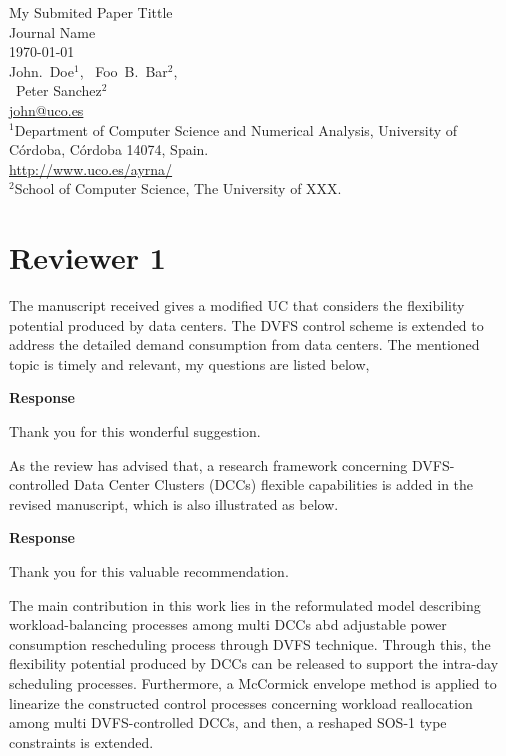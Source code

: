 \documentclass[a4paper,twoside,11pt]{reviewresponse}
\makeatletter
\newcommand{\myAuthors}{{John.~Doe$^{\displaystyle 1}$, ~Foo~B.~Bar$^{\displaystyle 2}$, } \\ {~Peter Sanchez$^{\displaystyle 2}$}}
\newcommand{\myEmail}{john@uco.es}
\newcommand{\myTitle}{My Submited Paper Tittle}
\newcommand{\myJournal}{Journal Name}
\newcommand{\myDept}{{$^{\displaystyle 1}$Department of Computer Science and Numerical Analysis, University of C\'{o}rdoba, C\'{o}rdoba 14074, Spain. \\ \url{http://www.uco.es/ayrna/}}\\
{$^{\displaystyle 2}$School of Computer Science, The University of XXX. }\\}
\makeatother
\begin{document}
\thispagestyle{plain}

\begin{center}
	{\LARGE\myTitle} \vspace{0.5cm} \\
	{\large\myJournal} \vspace{0.5cm} \\
	\today \vspace{0.5cm} \\
	\myAuthors \\
	\url{\myEmail} \vspace{1cm} \\
	\myDept
\end{center}

\tableofcontents

\begin{abstract}
	We thank the anonymous Reviewers for their efforts and feedback.
\end{abstract}

\section{Reviewer 1}

The manuscript received gives a modified UC that considers the flexibility potential produced by data centers. The DVFS control scheme is extended to address the detailed demand consumption from data centers. The mentioned topic is timely and relevant, my questions are listed below,


\textbf{Response}

Thank you for this wonderful suggestion.

As the review has advised that, a research framework concerning DVFS-controlled Data Center Clusters (DCCs) flexible capabilities is added in the
revised manuscript, which is also illustrated as below.


\textbf{Response}

Thank you for this valuable recommendation.

The main contribution in this work lies in the reformulated model describing workload-balancing processes among multi DCCs abd adjustable power
consumption rescheduling process through DVFS technique. Through this, the flexibility potential produced by DCCs can be released to support the
intra-day scheduling processes. Furthermore, a McCormick envelope method is applied to linearize the constructed control processes concerning workload reallocation among multi DVFS-controlled DCCs,
and then, a reshaped SOS-1 type constraints is extended.
\end{document}
